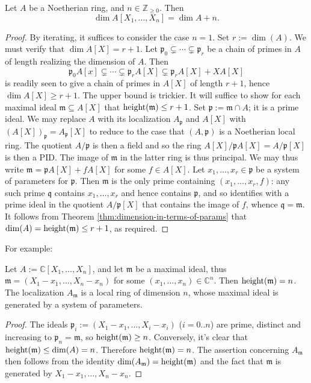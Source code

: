 \documentclass[10pt]{article}
\begin{document}
\begin{theorem}
Let $A$ be a Noetherian ring,
and $n \in \mathbb{Z}_{\geq 0}$.
Then \[\dim A[X_1,\dotsc,X_n] = \dim A + n.\]
\end{theorem}
\begin{proof}
  By iterating, it suffices to consider the case $n=1$.
  Set $r := \dim(A)$.
  We must verify that $\dim A[X] = r + 1$.
  Let $\mathfrak{p}_0 \subsetneq \dotsb \subsetneq
  \mathfrak{p}_r$ be a chain of primes in $A$ of length realizing the dimension of $A$.
  Then
  \[
    \mathfrak{p}_0 A[x] \subsetneq \dotsb \subsetneq
    \mathfrak{p}_r A[X]
    \subsetneq \mathfrak{p}_r A[X] + X A[X]
  \]
  is readily seen to give a chain of primes in $A[X]$ of length
  $r+1$,
  hence $\dim A[X] \geq r + 1$.
  The upper bound is trickier.
  It will suffice to show for each maximal ideal $\mathfrak{m}
  \subseteq A[X]$ 
  that $\operatorname{height}(\mathfrak{m}) \leq r + 1$.
  Set $\mathfrak{p} := \mathfrak{m} \cap A$;
  it is a prime ideal.
  We may replace $A$ with its localization $A_\mathfrak{p}$
  and $A[X]$ with 
  $(A[X])_\mathfrak{p} = A_\mathfrak{p}[X]$
  to reduce to the case that $(A,\mathfrak{p})$ is a Noetherian
  local ring.
  The quotient $A/\mathfrak{p}$ is then a field
  and so the ring $A[X]/\mathfrak{p} A[X] = A/\mathfrak{p}[X]$ is then
  a PID.
  The image of $\mathfrak{m}$ in the latter ring is thus
  principal.
  We may thus write $\mathfrak{m} = \mathfrak{p} A[X] + f A[X]$
  for some $f \in A[X]$.
  Let $x_1,\dotsc,x_r \in \mathfrak{p}$ be a system  of
  parameters for $\mathfrak{p}$.
  Then $\mathfrak{m}$ is the only prime containing
  $(x_1,\dotsc,x_r,f)$:
  any such prime $\mathfrak{q}$ contains $x_1,\dotsc,x_r$
  and hence contains $\mathfrak{p}$,
  and so identifies with a prime ideal in the quotient
  $A/\mathfrak{p}[X]$ that contains
  the image of $f$,
  whence $\mathfrak{q} = \mathfrak{m}$.
  It follows from Theorem
  \ref{thm:dimension-in-terms-of-params} that $\dim(A) = \operatorname{height}(\mathfrak{m}) \leq r + 1$, as required.
\end{proof}
For example:
\begin{proposition}
  Let $A := \mathbb{C}[X_1,\dotsc,X_n]$,
  and let $\mathfrak{m}$ be a maximal ideal,
  thus $\mathfrak{m} = (X_1-x_1,\dotsc,X_n-x_n)$
  for some $(x_1,\dotsc,x_n) \in \mathbb{C}^n$.
  Then
  $\operatorname{height}(\mathfrak{m}) = n$.
  The localization $A_\mathfrak{m}$ is a local ring of
  dimension $n$,
  whose maximal ideal is generated by a system of parameters.
\end{proposition}
\begin{proof}
  The  ideals $\mathfrak{p}_i := (X_1-x_1, \dotsc, X_i - x_i)$
  ($i=0..n$) are prime, distinct and increasing
  to $\mathfrak{p}_n = \mathfrak{m}$,
  so $\operatorname{height}(\mathfrak{m}) \geq n$.
  Conversely,
  it's clear that $\operatorname{height}(\mathfrak{m}) \leq \dim(A) = n$.
  Therefore $\operatorname{height}(\mathfrak{m}) = n$.
  The assertion concerning $A_\mathfrak{m}$
  then follows from the identity
  $\dim(A_\mathfrak{m}) = \operatorname{height}(\mathfrak{m})$
  and the fact that $\mathfrak{m}$
  is generated by $X_1-x_1,\dotsc,X_n-x_n$.
\end{proof}
\end{document}
